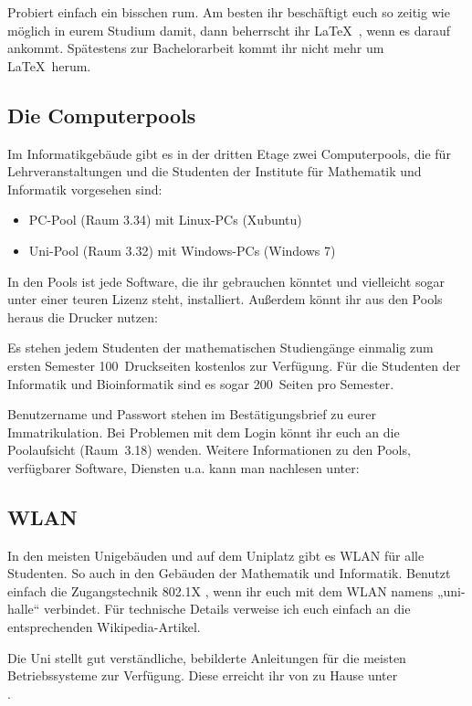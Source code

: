Probiert einfach ein bisschen rum.
Am besten ihr beschäftigt euch so zeitig wie möglich in eurem Studium damit, dann beherrscht ihr \LaTeX~, wenn es darauf ankommt.
Spätestens zur Bachelorarbeit kommt ihr nicht mehr um \LaTeX~herum.

\subsection[Computerpools]{Die Computerpools}
Im Informatikgebäude gibt es 
in der dritten Etage zwei Computerpools, 
die für Lehrveranstaltungen 
und die Studenten der Institute für Mathematik 
und Informatik vorgesehen sind:

\begin{itemize}
    \item PC-Pool (Raum 3.34) mit Linux-PCs (Xubuntu)
    \item Uni-Pool (Raum 3.32) mit Windows-PCs (Windows 7)
\end{itemize}

In den Pools ist jede Software, die ihr gebrauchen könntet 
und vielleicht sogar unter einer teuren Lizenz steht, installiert.
Außerdem könnt ihr aus den Pools heraus die Drucker nutzen:

Es stehen jedem Studenten der mathematischen Studiengänge 
einmalig zum ersten Semester 100~Druckseiten kostenlos zur Verfügung.
Für die Studenten der Informatik und Bioinformatik sind es 
sogar 200~Seiten pro Semester.

Benutzername und Passwort stehen im Bestätigungsbrief 
zu eurer Immatrikulation.
Bei Problemen mit dem Login könnt ihr euch 
an die Poolaufsicht (Raum~3.18) wenden.
Weitere Informationen zu den Pools, verfügbarer Software, 
Diensten u.a. kann man nachlesen unter:\\

\subsection{WLAN}

In den meisten Unigebäuden und auf dem Uniplatz gibt es WLAN für alle Studenten.
So auch in den Gebäuden der Mathematik und Informatik.
Benutzt einfach die Zugangstechnik 802.1X , wenn ihr euch mit dem WLAN namens „uni-halle“ verbindet.
Für technische Details verweise ich euch einfach an die entsprechenden Wikipedia-Artikel.

Die Uni stellt gut verständliche, bebilderte Anleitungen für die meisten Betriebssysteme zur Verfügung.
Diese erreicht ihr von zu Hause unter\\
.


